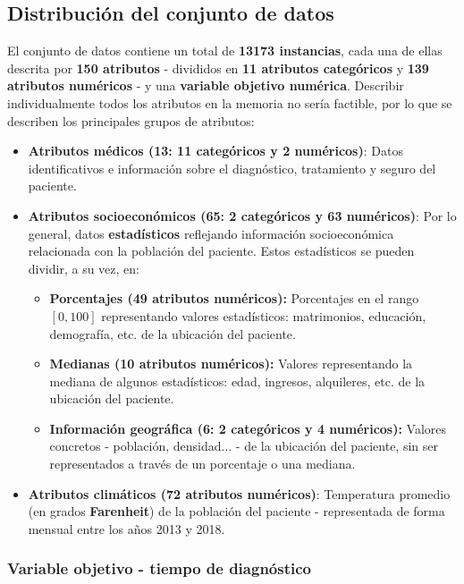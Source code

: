 \subsection{Distribución del conjunto de datos}

El conjunto de datos contiene un total de \textbf{13173 instancias}, cada una de ellas descrita por \textbf{150 atributos} - divididos en \textbf{11 atributos categóricos} y \textbf{139 atributos numéricos} - y una \textbf{variable objetivo numérica}. Describir individualmente todos los atributos en la memoria no sería factible, por lo que se describen los principales grupos de atributos:

\begin{itemize}
	\item \textbf{Atributos médicos (13: 11 categóricos y 2 numéricos)}: Datos identificativos e información sobre el diagnóstico, tratamiento y seguro del paciente.
	\item \textbf{Atributos socioeconómicos (65: 2 categóricos y 63 numéricos)}: Por lo general, datos \textbf{estadísticos} reflejando información socioeconómica relacionada con la población del paciente. Estos estadísticos se pueden dividir, a su vez, en:
	\begin{itemize}
		\item \textbf{Porcentajes (49 atributos numéricos):} Porcentajes en el rango $[0, 100]$ representando valores estadísticos: matrimonios, educación, demografía, etc. de la ubicación del paciente.
		\item \textbf{Medianas (10 atributos numéricos):} Valores representando la mediana de algunos estadísticos: edad, ingresos, alquileres, etc. de la ubicación del paciente.
		\item \textbf{Información geográfica (6: 2 categóricos y 4 numéricos):} Valores concretos - población, densidad... - de la ubicación del paciente, sin ser representados a través de un porcentaje o una mediana.
	\end{itemize}
	\item \textbf{Atributos climáticos (72 atributos numéricos)}: Temperatura promedio (en grados \textbf{Farenheit}) de la población del paciente - representada de forma mensual entre los años 2013 y 2018.
\end{itemize}

\subsubsection{Variable objetivo - tiempo de diagnóstico}

